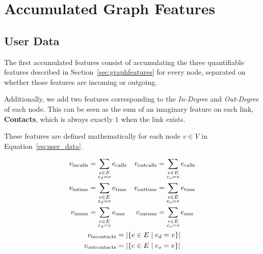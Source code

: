 \section{Accumulated Graph Features}
\label{sec:accumulatedfeatures}

\subsection{User Data}

The first accumulated features consist of accumulating the three quantifiable features described in Section~\ref{sec:graphfeatures} for every node, separated on whether those features are incoming or outgoing.

Additionally, we add two features corresponding to the \emph{In-Degree} and \emph{Out-Degree} of each node. This can be seen as the sum of an imaginary feature on each link, \textbf{Contacts}, which is always exactly $1$ when the link exists.

These features are defined mathematically for each node $v \in V$ in Equation~\ref{eq:user_data}.

\begin{equation}
\begin{gathered}
\begin{aligned}
v_{\operatorname{incalls}} &= \sum_{\substack{e \in E \\ e_d = v}} e_{\operatorname{calls}} &
v_{\operatorname{outcalls}} &= \sum_{\substack{e \in E \\ e_o = v}} e_{\operatorname{calls}} \\
v_{\operatorname{intime}} &= \sum_{\substack{e \in E \\ e_d = v}} e_{\operatorname{time}} &
v_{\operatorname{outtime}} &= \sum_{\substack{e \in E \\ e_o = v}} e_{\operatorname{time}} \\
v_{\operatorname{insms}} &= \sum_{\substack{e \in E \\ e_d = v}} e_{\operatorname{sms}} &
v_{\operatorname{outsms}} &= \sum_{\substack{e \in E \\ e_o = v}} e_{\operatorname{sms}} \\
\end{aligned} \\
\begin{aligned}
v_{\operatorname{incontacts}} &= \left| \left\{ e \in E \mid e_d = v \right\} \right| \\
v_{\operatorname{outcontacts}} &= \left| \left\{ e \in E \mid e_o = v \right\} \right|
\end{aligned}
\end{gathered}
\label{eq:user_data}
\end{equation}
